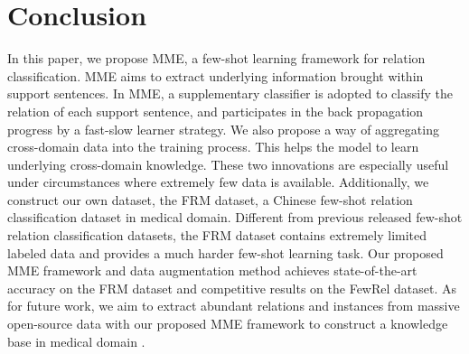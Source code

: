 \section{Conclusion}
In this paper, we propose MME, a few-shot learning framework for relation classification. MME aims to extract underlying information brought within support sentences. In MME, a supplementary classifier is adopted to classify the relation of each support sentence, and participates in the back propagation progress by a fast-slow learner strategy. We also propose a way of aggregating cross-domain data into the training process. This helps the model to learn underlying cross-domain knowledge. These two innovations are especially useful under circumstances where extremely few data is available.
Additionally, we construct our own dataset, the FRM dataset, a Chinese few-shot relation classification dataset in medical domain. Different from previous released few-shot relation classification datasets, the FRM dataset contains extremely limited labeled data and provides a much harder few-shot learning task. Our proposed MME framework and data augmentation method achieves state-of-the-art accuracy on the FRM dataset and competitive results on the FewRel dataset.
As for future work, we aim to extract abundant relations and instances from massive open-source data with our proposed MME framework to construct a knowledge base in medical domain .